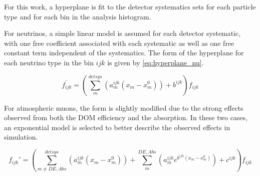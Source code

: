 For this work, a hyperplane is fit to the detector systematics sets for each particle type and for each bin in the analysis histogram.

For neutrinos, a simple linear model is assumed for each detector systematic, with one free coefficient associated with each systematic as well as one free constant term independent of the systematics.
The form of the hyperplane for each neutrino type in the bin $ijk$ is given by \ref{eq:hyperplane_nu}.

\begin{equation}
\label{eq:hyperplane_nu}
f_{ijk}^\prime = \left(\sum_m^{detsys}\left(a^{ijk}_m (x_m-x_m^0)\right) + b^{ijk}\right) f_{ijk}
\end{equation}

For atmospheric muons, the form is slightly modified due to the strong effects observed from both the DOM efficiency and the absorption.
In these two cases, an exponential model is selected to better describe the observed effects in simulation.

\begin{equation}
\label{eq:hyperplane_mu}
	f_{ijk}\prime = 
	\left(\sum_{m\neq DE,Abs}^{detsys}\left(a^{ijk}_m (x_m-x_m^0)\right) + \sum_m^{DE,Abs}\left(a^{ijk}_m e^{b^{ijk}(x_m-x_m^0)}\right) + c^{ijk}\right) f_{ijk}
\end{equation}


 


